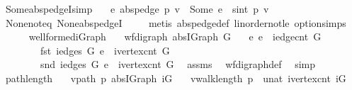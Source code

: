 \begin{isabellebody}
\ Some{\isacharunderscore}abs{\isacharunderscore}pedgeI{\isacharbrackleft}simp{\isacharbrackright}{\isacharcolon}\ \isanewline
\ \ {\isachardoublequoteopen}{\isacharparenleft}{\isasymexists}e{\isachardot}\ {\isacharparenleft}abs{\isacharunderscore}pedge\ p{\isacharparenright}\ v\ {\isacharequal}\ Some\ e{\isacharparenright}\ {\isacharequal}\ {\isacharparenleft}sint\ {\isacharparenleft}p\ v{\isacharparenright}\ {\isasymge}\ {}{\isacharparenright}{\isachardoublequoteclose}\isanewline
%
\isadelimproof
\ \ %
\endisadelimproof
%
\isatagproof
{}\isamarkupfalse%
\ None{\isacharunderscore}not{\isacharunderscore}eq\ None{\isacharunderscore}abs{\isacharunderscore}pedgeI\ \isanewline
\ \ \isamarkupfalse%
\ {\isacharparenleft}metis\ abs{\isacharunderscore}pedge{\isacharunderscore}def\ linorder{\isacharunderscore}not{\isacharunderscore}le\ option{\isachardot}simps{\isacharparenleft}{}{\isacharparenright}{\isacharparenright}%
\endisatagproof
{\isafoldproof}%
%
\isadelimproof
\isanewline
%
\endisadelimproof
\ \ \ \ \isanewline
\isanewline
\isanewline
{}\isamarkupfalse%
\ wellformed{\isacharunderscore}iGraph{\isacharcolon}\isanewline
\ \ \ {\isachardoublequoteopen}wf{\isacharunderscore}digraph\ {\isacharparenleft}abs{\isacharunderscore}IGraph\ G{\isacharparenright}{\isachardoublequoteclose}\isanewline
\ \ \ {\isachardoublequoteopen}{\isasymAnd}e{\isachardot}\ e\ {\isacharless}\ iedge{\isacharunderscore}cnt\ G\ {\isasymLongrightarrow}\ \isanewline
\ \ \ \ \ \ \ \ fst\ {\isacharparenleft}iedges\ G\ e{\isacharparenright}\ {\isacharless}\ ivertex{\isacharunderscore}cnt\ G\ {\isasymand}\ \isanewline
\ \ \ \ \ \ \ \ snd\ {\isacharparenleft}iedges\ G\ e{\isacharparenright}\ {\isacharless}\ ivertex{\isacharunderscore}cnt\ G{\isachardoublequoteclose}\ \isanewline
%
\isadelimproof
%
\endisadelimproof
%
\isatagproof
{}\isamarkupfalse%
\ assms\ \isamarkupfalse%
\ wf{\isacharunderscore}digraph{\isacharunderscore}def\ \isamarkupfalse%
\ simp%
\endisatagproof
{\isafoldproof}%
%
\isadelimproof
\isanewline
%
\endisadelimproof
\isanewline
{}\isamarkupfalse%
\ path{\isacharunderscore}length{\isacharcolon}\isanewline
\ \ \ {\isachardoublequoteopen}vpath\ p\ {\isacharparenleft}abs{\isacharunderscore}IGraph\ iG{\isacharparenright}{\isachardoublequoteclose}\isanewline
\ \ \ {\isachardoublequoteopen}vwalk{\isacharunderscore}length\ p\ {\isacharless}\ unat\ {\isacharparenleft}ivertex{\isacharunderscore}cnt\ iG{\isacharparenright}{\isachardoublequoteclose}\ \isanewline

\end{isabellebody}
